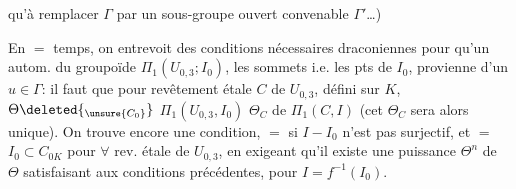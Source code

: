 qu'à remplacer $\Gamma$ par un sous-groupe ouvert convenable $\Gamma'$\ldots)

En $=$ temps, on entrevoit des conditions nécessaires draconiennes pour qu'un autom. \inserted{$\Theta$} du groupoïde $\Pi_1(U_{0,3};I_0)$,   les sommets i.e. les pts de $I_0$, provienne d'un $u\in\Gamma$: il faut que pour  revêtement  étale $C$ de $U_{0,3}$, défini sur $K$,      $\Theta\deleted{_{\unsure{C_0}}}$  $\Pi_1(U_{0,3},I_0)$   $\Theta_C$ de $\Pi_1(C,I)$     (cet $\Theta_C$ sera alors unique). On trouve encore une condition, $=$ si $I-I_0$ n'est pas surjectif, et   $=$  $I_0\subset C_{0K}$ pour $\forall$ rev. étale de $U_{0,3}$, en exigeant qu'il existe une puissance $\Theta^n$ de $\Theta$  satisfaisant aux conditions précédentes, pour $I=f^{-1}(I_0)$.
